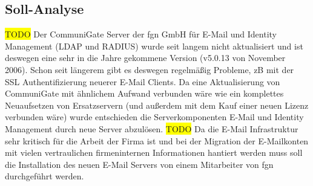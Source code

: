 \documentclass[11pt,a4paper,titlepage]{scrartcl} %
\newcommand{\hilight}[1]{\colorbox{yellow}{#1}} %
\begin{document}
\subsection{Soll-Analyse}
\hilight{TODO} Der CommuniGate Server der fgn GmbH f\"ur E-Mail und Identity Management (\mbox{LDAP} und \mbox{RADIUS}) wurde seit langem nicht aktualisiert und ist deswegen eine sehr in die Jahre gekommene Version (v5.0.13 von November 2006). Schon seit l\"angerem gibt es deswegen regelm\"a\ss{}ig Probleme, zB mit der SSL Authentifizierung neuerer E-Mail Clients. Da eine Aktualisierung von CommuniGate mit \"ahnlichem Aufwand verbunden w\"are wie ein komplettes Neuaufsetzen von Ersatzservern (und au\ss{}erdem mit dem Kauf einer neuen Lizenz verbunden w\"are) wurde entschieden die Serverkomponenten E-Mail und Identity Management durch neue Server abzul\"osen.
\hilight{TODO} Da die E-Mail Infrastruktur sehr kritisch f\"ur die Arbeit der Firma ist und bei der Migration der E-Mailkonten mit vielen vertraulichen firmeninternen Informationen hantiert werden muss soll die Installation des neuen E-Mail Servers von einem Mitarbeiter von fgn durchgef\"uhrt werden.


%
%
\end{document}
